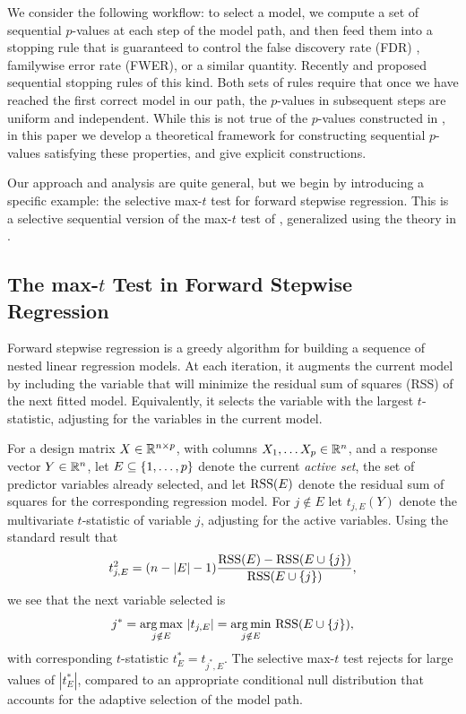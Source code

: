 \documentclass{article}
\begin{document}
We consider the following workflow: to select a model, we compute a set of sequential $p$-values at each step of the model path, and then feed them into a stopping rule that is guaranteed to control the false discovery rate (FDR) \citep{benjamini1995controlling}, familywise error rate (FWER), or a similar quantity. Recently \citet{gsell2013sequential} and \citet{li2015accumulation} proposed sequential stopping rules of this kind. Both sets of rules require that once we have reached the first correct model in our path, the $p$-values in subsequent steps are uniform and independent. While this is not true of the $p$-values constructed in \citet{taylor2014exact}, in this paper we develop a theoretical framework for constructing sequential $p$-values satisfying these properties, and give explicit constructions.

Our approach and analysis are quite general, but we begin by introducing a specific example: the selective max-$t$ test for forward stepwise regression.  This is a selective sequential version of the max-$t$ test of \citet{buja2014}, generalized using the theory in \citet{fithian2014optimal}.

\subsection{The max-$t$ Test in Forward Stepwise Regression}

Forward stepwise regression is a greedy algorithm for building a sequence of nested linear regression models. At each iteration, it augments the current model by including the variable that will minimize the residual sum of squares (RSS) of the next fitted model. Equivalently, it selects the variable with the largest $t$-statistic, adjusting for the variables in the current model.

For a design matrix $X\in \mathbb{R}^{n\times p}$, with columns $X_1,\ldots X_p \in \mathbb{R}^n$, and a response vector $Y\in \mathbb{R}^n$, let $E \subseteq \{1, \ldots, p\}$ denote the current {\em active set}, the set of predictor variables already selected, and let $\text{RSS}(E)$ denote the residual sum of squares for the corresponding regression model. For $j\notin E$ let $t_{j,E}(Y)$ denote the multivariate $t$-statistic of variable $j$, adjusting for the active variables. Using the standard result that
\begin{equation*}
t_{j,E}^2 = (n-|E|-1) \frac{\text{RSS}(E) - \text{RSS}(E \cup \{j\})}{\text{RSS}(E \cup \{j\})},
\end{equation*}
we see that the next variable selected is 
\begin{equation*}
j^* = \operatorname*{arg\,max}_{j\notin E} \, |t_{j,E}| = \operatorname*{arg\,min}_{j\notin E} \, \text{RSS}(E \cup \{j\}), 
\end{equation*}
with corresponding $t$-statistic $t_E^* = t_{j^*,E}$. The selective max-$t$ test rejects for large values of $|t_E^*|$, compared to an appropriate conditional null distribution that accounts for the adaptive selection of the model path.
\end{document}

